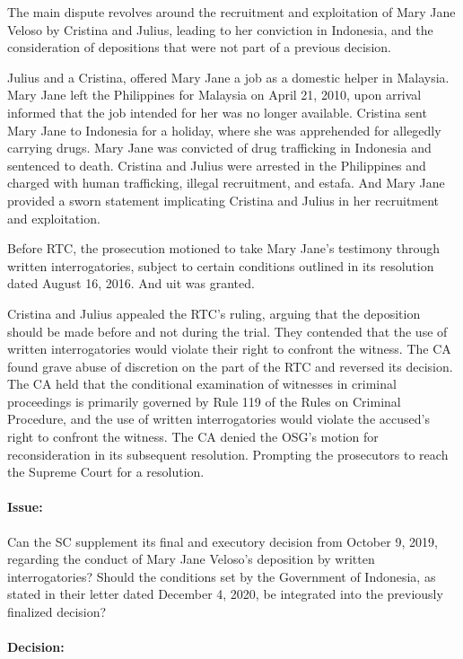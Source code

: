 \documentclass[
12pt,
oneside,
onehalfspacing,
headsepline
]{DigestCollection}
\begin{document}
The main dispute revolves around the recruitment and exploitation of Mary Jane Veloso by Cristina and Julius, leading to her conviction in Indonesia, and the consideration of depositions that were not part of a previous decision.

Julius and a Cristina, offered Mary Jane a job as a domestic helper in Malaysia. Mary Jane left the Philippines for Malaysia on April 21, 2010, upon arrival informed that the job intended for her was no longer available. Cristina sent Mary Jane to Indonesia for a holiday, where she was apprehended for allegedly carrying drugs. Mary Jane was convicted of drug trafficking in Indonesia and sentenced to death. Cristina and Julius were arrested in the Philippines and charged with human trafficking, illegal recruitment, and estafa. And Mary Jane provided a sworn statement implicating Cristina and Julius in her recruitment and exploitation.

Before RTC, the prosecution motioned to take Mary Jane's testimony through written interrogatories, subject to certain conditions outlined in its resolution dated August 16, 2016. And uit was granted.

Cristina and Julius appealed the RTC's ruling, arguing that the deposition should be made before and not during the trial. They contended that the use of written interrogatories would violate their right to confront the witness. The CA found grave abuse of discretion on the part of the RTC and reversed its decision. The CA held that the conditional examination of witnesses in criminal proceedings is primarily governed by Rule 119 of the Rules on Criminal Procedure, and the use of written interrogatories would violate the accused's right to confront the witness. The CA denied the OSG's motion for reconsideration in its subsequent resolution. Prompting the prosecutors to reach the Supreme Court for a resolution.

\paragraph{Issue:}
\label{da64a6e0-09fd-11ef-932c-63c852f65e48}


Can the SC supplement its final and executory decision from October 9, 2019, regarding the conduct of Mary Jane Veloso's deposition by written interrogatories? Should the conditions set by the Government of Indonesia, as stated in their letter dated December 4, 2020, be integrated into the previously finalized decision?

\paragraph{Decision:}
\label{dbdc52c0-09fd-11ef-932c-63c852f65e48}
\end{document}
